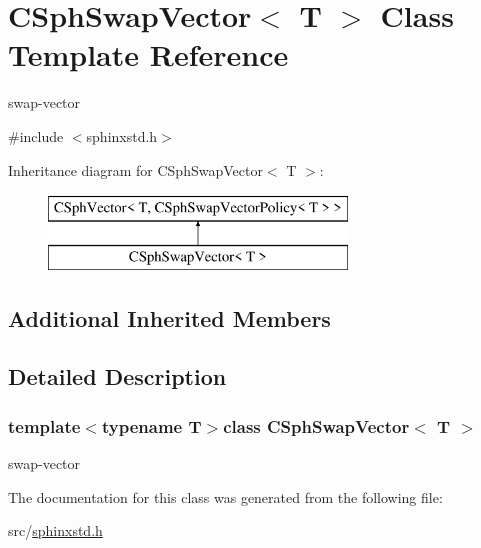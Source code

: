 \hypertarget{classCSphSwapVector}{\section{C\-Sph\-Swap\-Vector$<$ T $>$ Class Template Reference}
\label{classCSphSwapVector}
}


swap-\/vector  




{\ttfamily \#include $<$sphinxstd.\-h$>$}

Inheritance diagram for C\-Sph\-Swap\-Vector$<$ T $>$\-:\begin{figure}[H]
\begin{center}
\leavevmode
\includegraphics[height=2.000000cm]{classCSphSwapVector}
\end{center}
\end{figure}
\subsection*{Additional Inherited Members}


\subsection{Detailed Description}
\subsubsection*{template$<$typename T$>$class C\-Sph\-Swap\-Vector$<$ T $>$}

swap-\/vector 

The documentation for this class was generated from the following file\-:\begin{DoxyCompactItemize}
\item 
src/\hyperlink{sphinxstd_8h}{sphinxstd.\-h}\end{DoxyCompactItemize}

